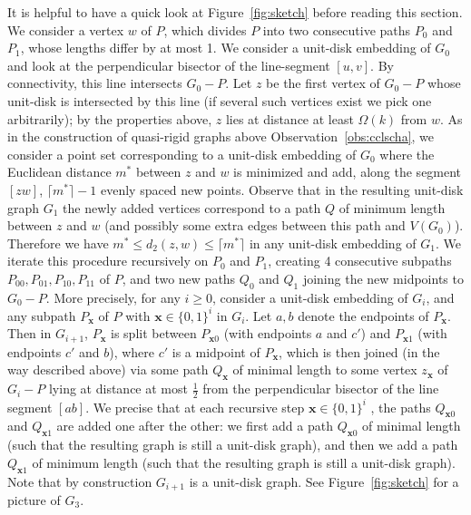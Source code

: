 \documentclass[a4paper,reqno, 12pt]{amsart}
\begin{document}
It is helpful to have a quick look at Figure~\ref{fig:sketch} before
reading this section. We consider a vertex $w$ of $P$, which divides $P$ into two consecutive
paths $P_0$ and $P_1$, whose lengths differ by at most 1. We consider
a unit-disk embedding of $G_0$ and look at the perpendicular
bisector of the line-segment $[u,v]$. By connectivity, this line
intersects $G_0-P$. Let $z$ be the first vertex of $G_0-P$ whose
unit-disk is intersected
by this line (if several such vertices exist we pick one arbitrarily); by the properties above, $z$ lies at distance
at least $\Omega(k)$ from $w$. As in the construction of quasi-rigid
graphs above Observation~\ref{obs:cclscha}, we consider a point set
corresponding to a unit-disk embedding of $G_0$ where the
Euclidean distance $m^*$ between $z$ and $w$ is
minimized and add, along the segment $[zw]$, $\lceil m^* \rceil
-1$ evenly spaced new points.
Observe that in the resulting unit-disk graph $G_1$ the newly added
vertices correspond to a
path $Q$ of minimum length between $z$ and $w$ (and possibly some extra edges between this
path and $V(G_0)$).
Therefore we have $m^*\leq d_2(z,w) \leq \lceil m^* \rceil$ in any unit-disk embedding of $G_1$.
We iterate this procedure recursively on $P_0$ and $P_1$,
creating 4 consecutive subpaths $P_{00}, P_{01}, P_{10}, P_{11}$ of
$P$, and two new paths $Q_0$ and $Q_1$ joining the new midpoints to $G_0-P$. More precisely, for any $i \ge 0$, consider a unit-disk embedding of $G_{i}$,
  and any subpath $P_\mathbf{x}$ of $P$ with 
  $\mathbf{x}\in \{0,1\}^i$ in $G_i$. Let $a,b$ denote the endpoints
  of  $P_\mathbf{x}$. Then in $G_{i+1}$, $P_\mathbf{x}$ is split between $P_{\mathbf{x}0}$ (with endpoints
$a$ and $c'$) and  $P_{\mathbf{x}1}$ (with endpoints
$c'$ and $b$), where $c'$ is a midpoint of $P_\mathbf{x}$, which is then
joined (in the way described above) via some path $Q_{\mathbf{x}}$ of minimal length to some vertex $z_{\mathbf{x}}$ of
$G_i-P$ lying at
distance at most $\tfrac12$ from the perpendicular bisector of the
line segment $[ab]$. We precise that at each recursive step $\mathbf{x}\in \{0,1\}^i$ , the
paths $Q_{\mathbf{x}0}$ and $Q_{\mathbf{x}1}$  are added one after the
other: we first add a path $Q_{\mathbf{x}0}$ of minimal length (such
that the resulting graph is still a unit-disk graph), and
then we add a path $Q_{\mathbf{x}1}$ of minimum length (such
that the resulting graph is still a unit-disk graph). Note that by construction $G_{i+1}$ is a
unit-disk graph.
See Figure~\ref{fig:sketch} for a picture of
$G_3$.
\end{document}
